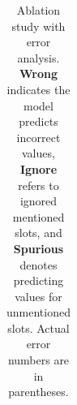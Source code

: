 \begin{table}[t]
{{\begin{tabular}{lccc}
\end{tabular}
}
}
\caption{Ablation study with error analysis. \textbf{Wrong} indicates the model predicts incorrect values, \textbf{Ignore} refers to ignored mentioned slots, and \textbf{Spurious} denotes predicting values for unmentioned slots.  Actual error numbers are in parentheses.}
\label{tab:err}
\vspace{-14pt}
\end{table}



